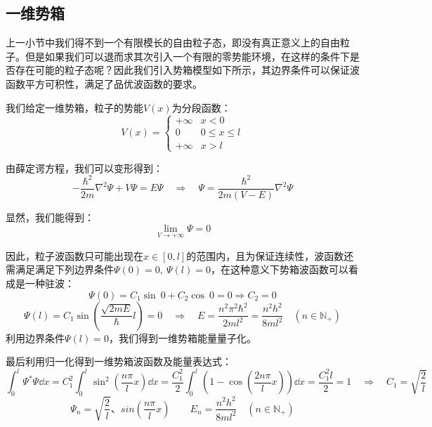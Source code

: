 \subsection{一维势箱}
上一小节中我们得不到一个有限模长的自由粒子态，即没有真正意义上的自由粒子。但是如果我们可以退而求其次引入一个有限的零势能环境，在这样的条件下是否存在可能的粒子态呢？因此我们引入势箱模型如下所示，其边界条件可以保证波函数平方可积性，满足了品优波函数的要求。

我们给定一维势箱，粒子的势能$V(x)$为分段函数：
\[V(x)=\left\{
\begin{array}{rl}
+\infty & x<0\\
0 & 0 \leq x \leq l\\
+\infty & x>l
\end{array} \right.\]

由薛定谔方程，我们可以变形得到：
\[-\frac{\hbar^2}{2m}\nabla^2\varPsi+V\varPsi=E\varPsi \quad \Rightarrow \quad \varPsi=\frac{\hbar^2}{2m(V-E)}\nabla^2\varPsi\]

显然，我们能得到：
\[\lim_{V \rightarrow +\infty}\varPsi=0\]

因此，粒子波函数只可能出现在$x \in [0,l]$的范围内，且为保证连续性，波函数还需满足满足下列边界条件$\varPsi(0)=0, \ \varPsi(l)=0$，在这种意义下势箱波函数可以看成是一种驻波：
\[\varPsi(0)=C_1\sin \ 0+C_2\cos \ 0=0 \Rightarrow C_2=0\]
\[\varPsi(l)=C_1\sin(\frac{\sqrt{2mE}}{\hbar}l)=0 \quad \Rightarrow \quad E=\frac{n^2 \pi^2 \hbar^2}{2ml^2}=\frac{n^2 h^2}{8ml^2} \quad (n\in\mathbb{N}_+)\]
利用边界条件$\varPsi(l)=0$，我们得到一维势箱能量量子化。

最后利用归一化得到一维势箱波函数及能量表达式：
\[\int_0^l\varPsi^*\varPsi\dd{x}=C_1^2\int_0^l \sin^2\left (\frac{n \pi}{l}x \right )\dd{x}=\frac{C_1^2}{2}\int_0^l\left ( 1- \cos\left (\frac{2n \pi}{l}x \right ) \right )\dd{x}=\frac{C_1^2l}{2}=1 \quad \Rightarrow \quad C_1=\sqrt{\frac{2}{l}}\]
\[\varPsi_n=\sqrt{\frac{2}{l}}、sin\left (\frac{n \pi}{l}x \right ) \qquad E_n=\frac{n^2 h^2}{8ml^2} \quad (n\in\mathbb{N}_+)\]

